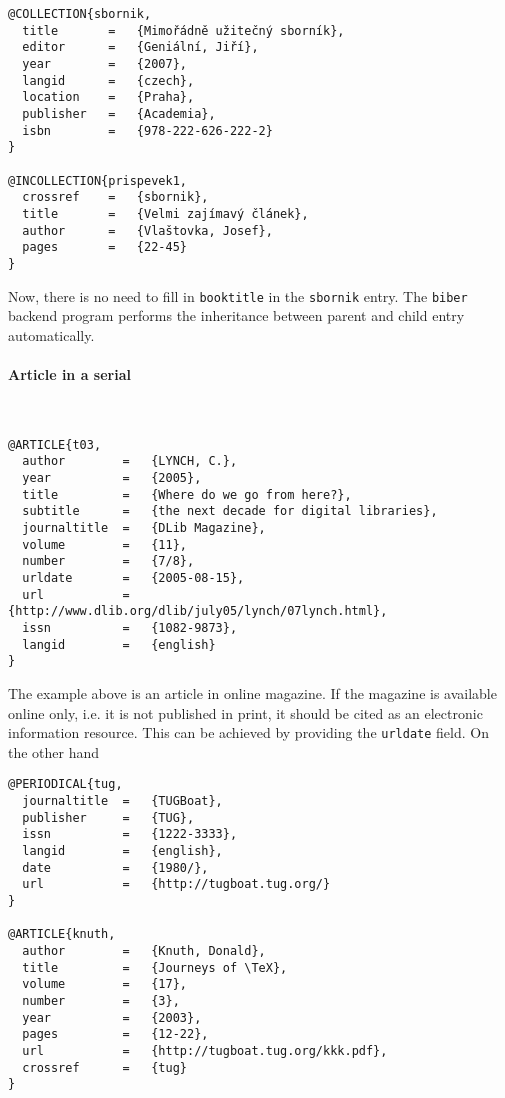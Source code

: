 \documentclass[a4paper,10pt]{ltxdockit}
\def\t|#1|{\texttt{#1}}
\def\c#1{%
\hangpara{3em}{1}%
\fullcite{#1}}
\begin{document}
\noindent\c{prispevek1}
 
\begin{verbatim}
@COLLECTION{sbornik,
  title       =   {Mimořádně užitečný sborník},
  editor      =   {Geniální, Jiří},
  year        =   {2007},
  langid      =   {czech},
  location    =   {Praha},
  publisher   =   {Academia},
  isbn        =   {978-222-626-222-2}
}

@INCOLLECTION{prispevek1,
  crossref    =   {sbornik},
  title       =   {Velmi zajímavý článek},
  author      =   {Vlaštovka, Josef},
  pages       =   {22-45}
}
\end{verbatim}

Now, there is no need to fill in \t|booktitle| in the \t|sbornik| entry.
The \t|biber| backend program performs the inheritance between parent and
child entry automatically.

\paragraph{Article in a serial}\hfill\\

\c{t03}
\begin{verbatim}
@ARTICLE{t03,
  author        =   {LYNCH, C.},
  year          =   {2005},
  title         =   {Where do we go from here?},
  subtitle      =   {the next decade for digital libraries},
  journaltitle  =   {DLib Magazine},
  volume        =   {11},
  number        =   {7/8},
  urldate       =   {2005-08-15},
  url           =   {http://www.dlib.org/dlib/july05/lynch/07lynch.html}, 
  issn          =   {1082-9873},
  langid        =   {english}
}
\end{verbatim}

The example above is an article in online magazine. If the magazine
is available online only, i.e. it is not published in print,
it should be cited as an electronic information resource. This can be
achieved by providing the \t|urldate| field. On the other hand
\newline

\c{knuth}
\begin{verbatim}
@PERIODICAL{tug,
  journaltitle  =   {TUGBoat},
  publisher     =   {TUG},
  issn          =   {1222-3333},
  langid        =   {english},
  date          =   {1980/},
  url           =   {http://tugboat.tug.org/}
}

@ARTICLE{knuth,
  author        =   {Knuth, Donald},
  title         =   {Journeys of \TeX},
  volume        =   {17},
  number        =   {3},
  year          =   {2003},
  pages         =   {12-22},
  url           =   {http://tugboat.tug.org/kkk.pdf},
  crossref      =   {tug}
}
\end{verbatim}
\end{document}
